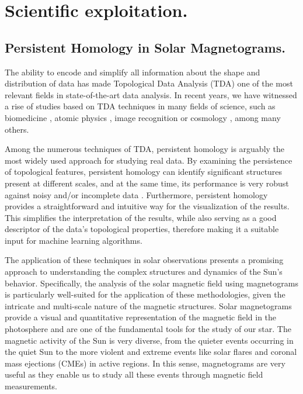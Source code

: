 \chapter{\label{CH:Science}Scientific exploitation.}

\section{Persistent Homology in Solar Magnetograms.}
The ability to encode and simplify all information about the shape and distribution of data has made Topological Data Analysis (TDA) one of the most relevant fields in state-of-the-art data analysis. In recent years, we have witnessed a rise of studies based on TDA techniques in many fields of science, such as biomedicine \citep{brain-PH}, atomic physics \citep{atomic}, image recognition \citep{Image-recognition} or cosmology \citep{cosmology}, among many others.

Among the numerous techniques of TDA, persistent homology is arguably the most widely used approach for studying real data. By examining the persistence of topological features, persistent homology can identify significant structures present at different scales, and at the same time, its performance is very robust against noisy and/or incomplete data \citep{PH_noisy}. Furthermore, persistent homology provides a straightforward and intuitive way for the visualization of the results. This simplifies the interpretation of the results, while also serving as a good descriptor of the data's topological properties, therefore making it a suitable input for machine learning algorithms.

The application of these techniques in solar observations presents a promising approach to understanding the complex structures and dynamics of the Sun's behavior. Specifically, the analysis of the solar magnetic field using magnetograms is particularly well-suited for the application of these methodologies, given the intricate and multi-scale nature of the magnetic structures. Solar magnetograms provide a visual and quantitative representation of the magnetic field in the photosphere and are one of the fundamental tools for the study of our star. The magnetic activity of the Sun is very diverse, from the quieter events occurring in the quiet Sun to the more violent and extreme events like solar flares and coronal mass ejections (CMEs) in active regions. In this sense, magnetograms are very useful as they enable us to study all these events through magnetic field measurements.

